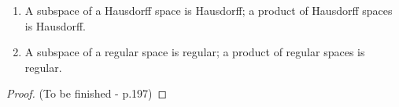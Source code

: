\begin{theorem}
    \leavevmode
    \begin{enumerate}
        \item A subspace of a Hausdorff space is Hausdorff; a product of Hausdorff spaces is Hausdorff.
        \item A subspace of a regular space is regular; a product of regular spaces is regular.
    \end{enumerate}
\end{theorem}
\begin{proof}
    (To be finished - p.197)
\end{proof}



